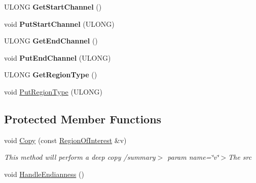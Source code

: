 \begin{DoxyCompactItemize}
\item 
\mbox{\label{class_canberra_1_1_data_types_1_1_spectroscopy_1_1_region_of_interest_a872cbc77ea65832730bbba1dfc905be2}} 
U\+L\+O\+NG {\bfseries Get\+Start\+Channel} ()
\item 
\mbox{\label{class_canberra_1_1_data_types_1_1_spectroscopy_1_1_region_of_interest_a65c3f6c23d118a2c1958349a5ac005e5}} 
void {\bfseries Put\+Start\+Channel} (U\+L\+O\+NG)
\item 
\mbox{\label{class_canberra_1_1_data_types_1_1_spectroscopy_1_1_region_of_interest_a73c78e64f54f893b1e873530376455ec}} 
U\+L\+O\+NG {\bfseries Get\+End\+Channel} ()
\item 
\mbox{\label{class_canberra_1_1_data_types_1_1_spectroscopy_1_1_region_of_interest_a16c13bb2b5561acf6fa2e11056b03dc8}} 
void {\bfseries Put\+End\+Channel} (U\+L\+O\+NG)
\item 
\mbox{\label{class_canberra_1_1_data_types_1_1_spectroscopy_1_1_region_of_interest_a25564f5ddd866f02168b17d14a1aa320}} 
U\+L\+O\+NG {\bfseries Get\+Region\+Type} ()
\item 
void \hyperlink{class_canberra_1_1_data_types_1_1_spectroscopy_1_1_region_of_interest_ae1820eab6fe54c57dbe26acd8735d06d_ae1820eab6fe54c57dbe26acd8735d06d}{Put\+Region\+Type} (U\+L\+O\+NG)
\end{DoxyCompactItemize}
\subsection*{Protected Member Functions}
\begin{DoxyCompactItemize}
\item 
\mbox{\label{class_canberra_1_1_data_types_1_1_spectroscopy_1_1_region_of_interest_a2671066e4f786bc8788cc4d064802d02}} 
void \hyperlink{class_canberra_1_1_data_types_1_1_spectroscopy_1_1_region_of_interest_a2671066e4f786bc8788cc4d064802d02}{Copy} (const \hyperlink{class_canberra_1_1_data_types_1_1_spectroscopy_1_1_region_of_interest}{Region\+Of\+Interest} \&v)
\begin{DoxyCompactList}\small\item\em This method will perform a deep copy /summary$>$ param name=\char`\"{}v\char`\"{}$>$The src\end{DoxyCompactList}\item 
void \hyperlink{class_canberra_1_1_data_types_1_1_spectroscopy_1_1_region_of_interest_ac1fa66449af9ef06c5c29b9cb32d0c62_ac1fa66449af9ef06c5c29b9cb32d0c62}{Handle\+Endianness} ()
\end{DoxyCompactItemize}
